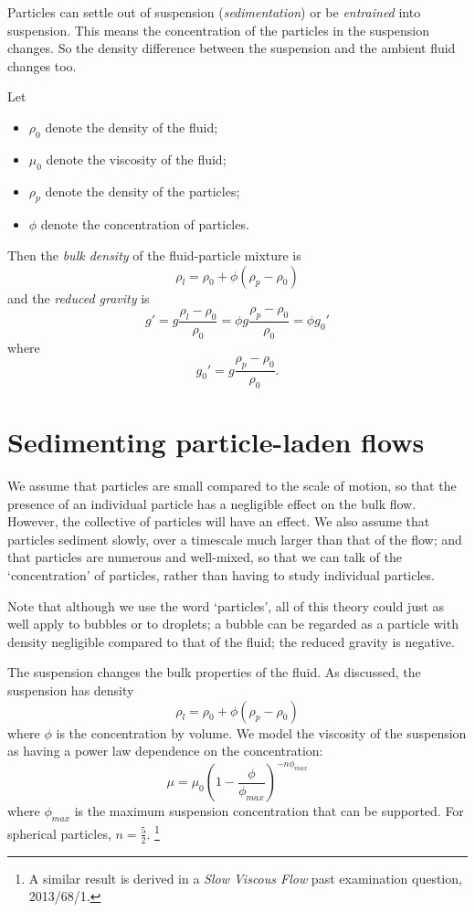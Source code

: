 Particles can settle out of suspension (\textit{sedimentation}) or be
\textit{entrained} into suspension. This means the concentration of the
particles in the suspension changes. So the density difference between the
suspension and the ambient fluid changes too. 

Let
\begin{itemize}
 \item $\rho_0$ denote the density of the fluid;
 \item $\mu_0$ denote the viscosity of the fluid;
 \item $\rho_p$ denote the density of the particles;
 \item $\phi$ denote the concentration of particles.
\end{itemize}
Then the \textit{bulk density} of the fluid-particle mixture is
\begin{equation}
    \rho_l = \rho_0 + \phi (\rho_p - \rho_0) 
\end{equation}
and the \textit{reduced gravity} is
\begin{equation}
 g' = g \frac{\rho_l - \rho_0}{\rho_0} = \phi g \frac{\rho_p - \rho_0}{\rho_0} = \phi g_0'
\end{equation}
where
\begin{equation}
    g_0' = g \frac{\rho_p - \rho_0}{\rho_0}.
\end{equation}

\section{Sedimenting particle-laden flows}

We assume that particles are small compared to the scale of motion, so that the presence of an individual particle has a negligible effect on the bulk flow. However, the collective of particles will have an effect. We also assume that particles sediment slowly, over a timescale much larger than that of the flow; and that particles are numerous and well-mixed, so that we can talk of the `concentration' of particles, rather than having to study individual particles.

Note that although we use the word `particles', all of this theory could just as well apply to bubbles or to droplets; a bubble can be regarded as a particle with density negligible compared to that of the fluid; the reduced gravity is negative.

The suspension changes the bulk properties of the fluid. As discussed, the suspension has density
\begin{equation}
        \rho_l = \rho_0 + \phi (\rho_p - \rho_0)
\end{equation}
where $\phi$ is the concentration by volume. We model the viscosity of the suspension as having a power law dependence on the concentration: 
\begin{equation}
 \mu = \mu_0 \left( 1 - \frac{\phi}{\phi_{max}} \right)^{-n \phi_{max}}
\end{equation}
where $\phi_{max}$ is the maximum suspension concentration that can be supported. For spherical particles, $n = \frac{5}{2}$.
\footnote{A similar result is derived in a \textit{Slow Viscous Flow} past examination question, 2013/68/1.}

